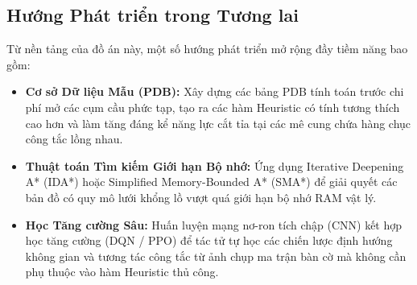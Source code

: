 \subsection{Hướng Phát triển trong Tương lai}
Từ nền tảng của đồ án này, một số hướng phát triển mở rộng đầy tiềm năng
bao gồm:
\begin{itemize}[--]
    \item \textbf{Cơ sở Dữ liệu Mẫu (PDB):}
    Xây dựng các bảng PDB tính toán trước chi phí mở các cụm cầu phức tạp,
    tạo ra các hàm Heuristic có tính tương thích cao hơn và làm tăng đáng kể
    năng lực cắt tỉa tại các mê cung chứa hàng chục công tắc lồng nhau.

    \item \textbf{Thuật toán Tìm kiếm Giới hạn Bộ nhớ:}
    Ứng dụng Iterative Deepening A* (IDA*) hoặc Simplified Memory-Bounded A*
    (SMA*) để giải quyết các bản đồ có quy mô lưới khổng lồ vượt quá giới hạn
    bộ nhớ RAM vật lý.

    \item \textbf{Học Tăng cường Sâu:}
    Huấn luyện mạng nơ-ron tích chập (CNN) kết hợp học tăng cường (DQN / PPO)
    để tác tử tự học các chiến lược định hướng không gian và tương tác công
    tắc từ ảnh chụp ma trận bàn cờ mà không cần phụ thuộc vào hàm Heuristic thủ
    công.
\end{itemize}
